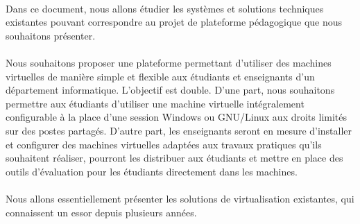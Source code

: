 \paragraph{} Dans ce document, nous allons étudier les systèmes et solutions
techniques existantes pouvant correspondre au projet de plateforme pédagogique
que nous souhaitons présenter.

\paragraph{} Nous souhaitons proposer une plateforme permettant d'utiliser des
machines virtuelles de manière simple et flexible aux étudiants et enseignants
d'un département informatique. L'objectif est double. D'une part, nous
souhaitons permettre aux étudiants d'utiliser une machine virtuelle
intégralement configurable à la place d'une session Windows ou GNU/Linux aux
droits limités sur des postes partagés. D'autre part, les enseignants seront en
mesure d'installer et configurer des machines virtuelles adaptées aux travaux
pratiques qu'ils souhaitent réaliser, pourront les distribuer aux étudiants et
mettre en place des outils d'évaluation pour les étudiants directement dans les
machines.

\paragraph{} Nous allons essentiellement présenter les solutions de virtualisation existantes, qui connaissent un essor depuis plusieurs années.
